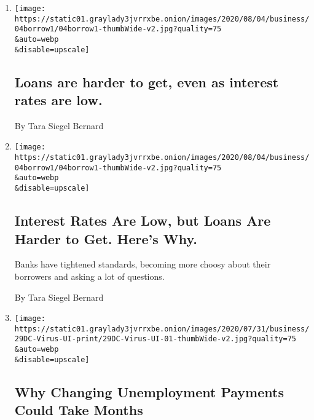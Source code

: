 \begin{enumerate}
\def\labelenumi{\arabic{enumi}.}
\item
  \href{/live/2020/08/04/business/stock-market-today-coronavirus/loans-are-harder-to-get-even-as-interest-rates-are-low}{}

  \texttt{[image: https://static01.graylady3jvrrxbe.onion/images/2020/08/04/business/04borrow1/04borrow1-thumbWide-v2.jpg?quality=75\\\&auto=webp\\\&disable=upscale]}

  \hypertarget{loans-are-harder-to-get-even-as-interest-rates-are-low}{%
  \subsection{Loans are harder to get, even as interest rates are
  low.}\label{loans-are-harder-to-get-even-as-interest-rates-are-low}}

  By Tara Siegel Bernard
\item
  \href{/2020/08/04/your-money/mortgage-loans-credit-cards-coronavirus.html}{}

  \texttt{[image: https://static01.graylady3jvrrxbe.onion/images/2020/08/04/business/04borrow1/04borrow1-thumbWide-v2.jpg?quality=75\\\&auto=webp\\\&disable=upscale]}

  \hypertarget{interest-rates-are-low-but-loans-are-harder-to-get-heres-why}{%
  \subsection{Interest Rates Are Low, but Loans Are Harder to Get.
  Here's
  Why.}\label{interest-rates-are-low-but-loans-are-harder-to-get-heres-why}}

  Banks have tightened standards, becoming more choosy about their
  borrowers and asking a lot of questions.

  By Tara Siegel Bernard
\item
  \href{/2020/07/30/business/unemployment-payments-change.html}{}

  \texttt{[image: https://static01.graylady3jvrrxbe.onion/images/2020/07/31/business/29DC-Virus-UI-print/29DC-Virus-UI-01-thumbWide-v2.jpg?quality=75\\\&auto=webp\\\&disable=upscale]}

  \hypertarget{why-changing-unemployment-payments-could-take-months}{%
  \subsection{Why Changing Unemployment Payments Could Take
  Months}\label{why-changing-unemployment-payments-could-take-months}}


\end{enumerate}
